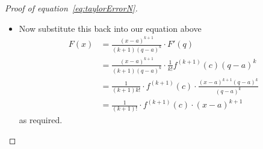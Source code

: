 \begin{proof}[Proof of equation~\eqref{eq:taylorErrorN}]
\begin{itemize}
\item Now substitute this back into our equation above
\begin{align*}
  F(x) &= \frac{(x-a)^{k+1}}{(k+1)(q-a)^k} \cdot F'(q) \\
  &= \frac{(x-a)^{k+1}}{(k+1)(q-a)^k} \cdot \frac{1}{k!} f^{(k+1)}(c)(q-a)^k \\
  &= \frac{1}{(k+1)k!} \cdot f^{(k+1)}(c) \cdot
\frac{(x-a)^{k+1}(q-a)^k}{(q-a)^k} \\
  &= \frac{1}{(k+1)!} \cdot f^{(k+1)}(c) \cdot(x-a)^{k+1}
\end{align*}
as required.
\end{itemize}


%
%
%
%

\end{proof}
